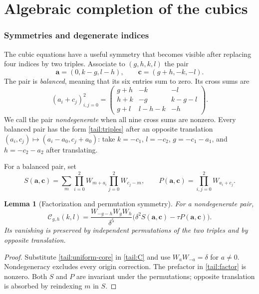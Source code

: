 \documentclass[11pt]{article}
\numberwithin{equation}{section}
\newtheorem{lemma}[theorem]{Lemma}
\theoremstyle{definition}
\theoremstyle{remark}
\begin{document}
\part{Algebraic completion of the cubics}
\label{part:completion}
\section{Symmetries and degenerate indices}
\label{sec:degenerate}

The cubic equations have a useful symmetry that becomes visible after
replacing four indices by two triples. Associate to $(g,h,k,l)$ the pair
\begin{equation}\label{tail:triples}
 \boldsymbol a=(0,k-g,l-h),\qquad
 \boldsymbol c=(g+h,-k,-l).
\end{equation}
The pair is \emph{balanced}, meaning that its six entries sum to zero.
Its cross sums are
\begin{equation}\label{tail:crossmatrix}
 (a_i+c_j)_{i,j=0}^2=
 \begin{pmatrix}
 g+h&-k&-l\\
 h+k&-g&k-g-l\\
 g+l&l-h-k&-h
 \end{pmatrix}.
\end{equation}
We call the pair \emph{nondegenerate} when all nine cross sums are nonzero.
Every balanced pair has the form \eqref{tail:triples} after an opposite
translation $(a_i,c_j)\mapsto(a_i-a_0,c_j+a_0)$: take
$k=-c_1$, $l=-c_2$, $g=-c_1-a_1$, and $h=-c_2-a_2$ after translating.

For a balanced pair, set
\[
 S(\boldsymbol a,\boldsymbol c)
 =\sum_m\prod_{i=0}^2W_{m+a_i}\prod_{j=0}^2W_{c_j-m},
 \qquad
 P(\boldsymbol a,\boldsymbol c)=\prod_{i,j=0}^2W_{a_i+c_j}.
\]

\begin{lemma}[Factorization and permutation symmetry]\label{tail:factor-lemma}
For a nondegenerate pair,
\begin{equation}\label{tail:factor}
 \mathcal C_{g,h}(k,l)
 =\frac{W_{-g-h}W_gW_h}{\delta^5}
       \bigl(\delta^2S(\boldsymbol a,\boldsymbol c)
                      -\tau P(\boldsymbol a,\boldsymbol c)\bigr).
\end{equation}
Its vanishing is preserved by independent permutations of the two
triples and by opposite translation.
\end{lemma}

\begin{proof}
Substitute \eqref{tail:uniform-core} in \eqref{tail:C} and use
$W_aW_{-a}=\delta$ for $a\ne0$. Nondegeneracy excludes every origin
correction. The prefactor in \eqref{tail:factor} is nonzero.
Both $S$ and $P$ are invariant under the permutations; opposite
translation is absorbed by reindexing $m$ in $S$.
\end{proof}
\end{document}
